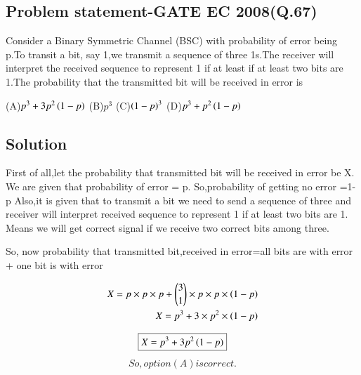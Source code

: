 \documentclass[journal,12pt,twocolumn]{IEEEtran}
\begin{document}
 \begin{center}
     \section{\textbf{Problem statement-GATE EC 2008(Q.67)}}
Consider a Binary Symmetric Channel (BSC) with probability of error being p.To transit a bit, say 1,we transmit a sequence of three 1s.The receiver will interpret the received sequence to represent 1 if at least if at least two bits are 1.The probability that the transmitted bit will be received in error is
 \end{center}
(A)$p^3 + 3 p^2\left(1-p\right)$ 
\newline
(B)$p^3$
\newline
(C)$\left(1-p\right)^3$
\newline
(D)$p^3+p^2\left(1-p\right)$
\begin{center}
    \section{\textbf{Solution}}
\end{center}

First of all,let the probability that transmitted bit will be received in error be X.
\newline
We are given that probability of error = p.  
\newline
So,probability of getting no error =1-p
\newline
\newline
Also,it is given that to transmit a bit we need to send a sequence of three and receiver will interpret received sequence to represent 1 if at least two bits are 1. Means we will get correct signal if we receive two correct bits among three.
\newline
 
 So, now probability that transmitted bit,received in error=all bits are with error + one bit is with error 

\begin{align}
    X =p \times p \times p + {3 \choose 1} \times p \times p \times \left(1-p\right)
    \\
    X = p^3+3 \times p^2 \times \left(1-p\right)
\end{align}

\begin{equation}
    \boxed{X=p^3+3p^2 \left(1-p\right)}
\end{equation}
\begin{align}
   So,option (A) is correct.
\end{align}
\end{document}
